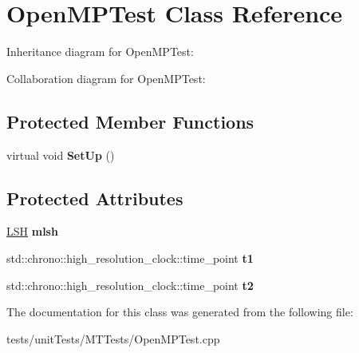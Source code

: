 \hypertarget{classOpenMPTest}{}\section{Open\+M\+P\+Test Class Reference}
\label{classOpenMPTest}


Inheritance diagram for Open\+M\+P\+Test\+:


Collaboration diagram for Open\+M\+P\+Test\+:
\subsection*{Protected Member Functions}
\begin{DoxyCompactItemize}
\item 
virtual void {\bfseries Set\+Up} ()\hypertarget{classOpenMPTest_a2d079cfaf3511cfe14ec31019eb1c388}{}\label{classOpenMPTest_a2d079cfaf3511cfe14ec31019eb1c388}

\end{DoxyCompactItemize}
\subsection*{Protected Attributes}
\begin{DoxyCompactItemize}
\item 
\hyperlink{classLSH}{L\+SH} {\bfseries mlsh}\hypertarget{classOpenMPTest_a07ebe78ee32d409061966c5c8345e57d}{}\label{classOpenMPTest_a07ebe78ee32d409061966c5c8345e57d}

\item 
std\+::chrono\+::high\+\_\+resolution\+\_\+clock\+::time\+\_\+point {\bfseries t1}\hypertarget{classOpenMPTest_aeef0bdcf89b474615bc32fe8c4a02075}{}\label{classOpenMPTest_aeef0bdcf89b474615bc32fe8c4a02075}

\item 
std\+::chrono\+::high\+\_\+resolution\+\_\+clock\+::time\+\_\+point {\bfseries t2}\hypertarget{classOpenMPTest_a43e81d1877ef25555679416f1be51172}{}\label{classOpenMPTest_a43e81d1877ef25555679416f1be51172}

\end{DoxyCompactItemize}


The documentation for this class was generated from the following file\+:\begin{DoxyCompactItemize}
\item 
tests/unit\+Tests/\+M\+T\+Tests/Open\+M\+P\+Test.\+cpp\end{DoxyCompactItemize}
